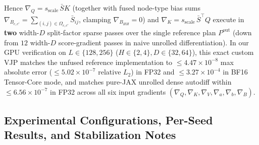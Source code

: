 \documentclass[11pt]{article}
\begin{document}
Hence $\nabla_Q = s_{\text{scale}}\, \bar{S} K$ (together with fused node-type bias sums $\nabla_{B_{c,c'}} = \sum_{(i,j)\in\Omega_{c,c'}} \bar{S}_{ij}$, clamping $\nabla_{B_{HH}} = 0$) and $\nabla_K = s_{\text{scale}}\, \bar{S}^\top Q$ execute in \textbf{two} width-$D$ split-factor sparse passes over the single reference plan $P^{\text{out}}$ (down from $12$ width-$D$ score-gradient passes in naive unrolled differentiation). In our GPU verification on $L \in \{128, 256\}$ ($H \in \{2,4\}, D \in \{32,64\}$), this exact custom VJP matches the unfused reference implementation to $\le 4.47\times 10^{-8}$ max absolute error ($\le 5.02\times 10^{-7}$ relative $L_2$) in FP32 and $\le 3.27\times 10^{-4}$ in BF16 Tensor-Core mode, and matches pure-JAX unrolled dense autodiff within $\le 6.56\times 10^{-7}$ in FP32 across all six input gradients $(\nabla_Q, \nabla_K, \nabla_V, \nabla_a, \nabla_b, \nabla_B)$.

\subsection{Experimental Configurations, Per-Seed Results, and Stabilization Notes}
\end{document}
